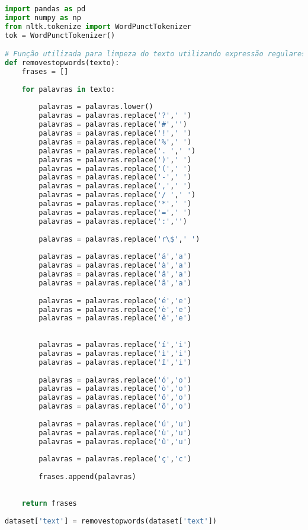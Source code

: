 \begin{lstlisting}[language=Python]
import pandas as pd  
import numpy as np
from nltk.tokenize import WordPunctTokenizer
tok = WordPunctTokenizer()

# Função utilizada para limpeza do texto utilizando expressão regulares
def removestopwords(texto):
    frases = []
   
    for palavras in texto:
        
        palavras = palavras.lower()
        palavras = palavras.replace('?',' ')
        palavras = palavras.replace('#','')
        palavras = palavras.replace('!',' ')
        palavras = palavras.replace('%',' ')
        palavras = palavras.replace('. ',' ')
        palavras = palavras.replace(')',' ')
        palavras = palavras.replace('(',' ')
        palavras = palavras.replace('-',' ')
        palavras = palavras.replace(',',' ')
        palavras = palavras.replace('/ ',' ')
        palavras = palavras.replace('*',' ')
        palavras = palavras.replace('=',' ')
        palavras = palavras.replace(':','')
        
        palavras = palavras.replace('r\$',' ')
               
        palavras = palavras.replace('á','a')
        palavras = palavras.replace('à','a')
        palavras = palavras.replace('â','a')
        palavras = palavras.replace('ã','a')
        
        palavras = palavras.replace('é','e')
        palavras = palavras.replace('è','e')
        palavras = palavras.replace('ê','e')
        
        
        palavras = palavras.replace('í','i')
        palavras = palavras.replace('ì','i')
        palavras = palavras.replace('î','i')
                       
        palavras = palavras.replace('ó','o')
        palavras = palavras.replace('ò','o')
        palavras = palavras.replace('ô','o')
        palavras = palavras.replace('õ','o')
        
        palavras = palavras.replace('ú','u')
        palavras = palavras.replace('ù','u')
        palavras = palavras.replace('û','u')
               
        palavras = palavras.replace('ç','c')
              
        frases.append(palavras)
                                    
        
    return frases
    
dataset['text'] = removestopwords(dataset['text'])
\end{lstlisting}


